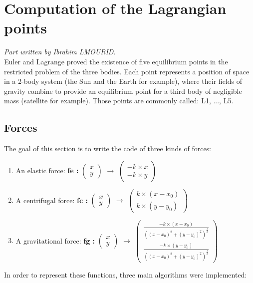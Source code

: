 \documentclass{article}
\begin{document}
\newpage
\section{Computation of the Lagrangian points}
\textit{Part written by Ibrahim LMOURID.}\\
Euler and Lagrange proved the existence of five equilibrium points in the restricted problem of the three bodies. Each point represents a position of space in a 2-body system (the Sun and the Earth for example), where their fields of gravity combine to provide an equilibrium point for a third body of negligible mass (satellite for example). Those points are commonly called: L1, ..., L5.

\subsection{Forces}
\noindent The goal of this section is to write the code of three kinds of forces: 
\begin{enumerate}
    \item An elastic force: \textbf{fe :}
    $\begin{pmatrix} 
    x \\ 
    y 
    \end{pmatrix}$ $\longrightarrow$
    $\begin{pmatrix}
    -k\times x \\
    -k\times y
    \end{pmatrix}$
    \item A centrifugal force: \textbf{fc :}
    $\begin{pmatrix} 
    x \\ 
    y 
    \end{pmatrix}$ $\longrightarrow$
    $\begin{pmatrix}
    k\times (x-x_0) \\
    k\times (y-y_0)
    \end{pmatrix}$
    
    \item A gravitational force: \textbf{fg :} 
    $\begin{pmatrix} 
    x \\ 
    y 
    \end{pmatrix}$ $\longrightarrow$
    $\begin{pmatrix}
    \frac{-k\times (x-x_0)}{((x-x_0)^2+(y-y_0)^2)^\frac{3}{2}} \\
    \frac{-k\times (y-y_0)}{((x-x_0)^2+(y-y_0)^2)^\frac{3}{2}}
    \end{pmatrix}$
\end{enumerate}
In order to represent these functions, three main algorithms were implemented:
\end{document}
